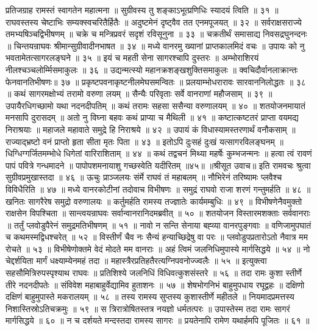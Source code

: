 प्रतिजग्राह रामस्तं स्वागतेन महात्मना ॥
सुग्रीवस्य तु शङ्काऽभूत्प्रणिधिः स्यादयं त्विति ॥ ३१ ॥
राघवस्तस्य चेष्टाभिः सम्यक्स्वचरितैर्हितैः ॥
अदुष्टमेनं दृष्ट्वैव तत एनमपूजयत् ॥ ३२ ॥
सर्वराक्षसराज्ये तमभ्यषिञ्चद्विभीषणम् ॥
चक्रे च मन्त्रिप्रवरं सदृशं रविसूनुना ॥ ३३ ॥
चक्रतीर्थं समासाद्य निवसद्रघुनन्दनः ॥
चिन्तयन्राघवः श्रीमान्सुग्रीवादीनभाषत ॥ ३४ ॥
मध्ये वानरमु ख्यानां प्राप्तकालमिदं वचः ॥
उपायः को नु भवतामेतत्सागरलङ्घने ॥ ३५ ॥
इयं च महती सेना सागरश्चापि दुस्तरः ॥
अम्भोराशिरयं नीलश्चञ्चलोर्म्मिसमाकुलः ॥ ३६ ॥
उद्यन्मत्स्यो महानक्रशङ्खशुक्तिसमाकुलः ॥
क्वचिदौर्वानलाक्रान्तः फेनवानतिभीषणः॥ ३७ ॥
प्रकृष्टपवनाकृष्टनीलमेघसमन्वितः ॥
प्रलयाम्भोधरारावः सारवाननिलोद्धतः ॥ ३८ ॥
कथं सागरमक्षोभ्यं तरामो वरुणा लयम् ॥
सैन्यैः परिवृताः सर्वे वानराणां महौजसाम् ॥ ३९ ॥
उपायैरधिगच्छामो यथा नदनदीपतिम् ॥
कथं तरामः सहसा ससैन्या वरुणालयम् ॥ ४० ॥
शतयोजनमायातं मनसापि दुरासदम् ॥
अतो नु विघ्ना बहवः कथं प्राप्या च मैथिली ॥ ४१ ॥
कष्टात्कष्टतरं प्राप्ता वयमद्य निराश्रयाः ॥
महाजले महावाते समुद्रे हि निराश्रये ॥ ४२ ॥
उपायं कं विधास्यामस्तरणार्थं वनौकसाम् ॥
राज्याद्भ्रष्टो वनं प्राप्तो हृता सीता मृतः पिता ॥ ४३ ॥
इतोऽपि दुःसहं दुःखं यत्सागरविलङ्घनम् ॥
धिग्धिग्गर्जितमम्भोधे धिगेतां वारिराशिताम् ॥ ४४ ॥
कथं तद्वचनं मिथ्या महर्षेः कुम्भजन्मनः ॥
हत्वा त्वं रावणं पापं पवित्रे गन्धमादने ॥
पापोपशमनायाशु गच्छस्वेति यदीरितम् ॥४५॥
॥श्रीसूत उवाच॥
इति रामवचः श्रुत्वा सुग्रीवप्रमुखास्तदा ॥ ४६ ॥
ऊचुः प्राञ्जलयः संर्मे राघवं तं महाबलम् ॥
नौभिरेनं तरिष्यामः प्लवैश्च विविधैरिति ॥ ४७ ॥
मध्ये वानरकोटीनां तदोवाच विभीषणः ॥
समुद्रं राघवो राजा शरणं गन्तुमर्हति ॥ ४८ ॥
खनितः सागरैरेष समुद्रो वरुणालयः ॥
कर्तुमर्हति रामस्य तज्ज्ञातेः कार्यमम्बुधिः ॥ ४९ ॥
विभीषणेनैवमुक्तो राक्षसेन विपश्चिता ॥
सान्त्वयन्राघवः सर्वान्वानरानिदमब्रवीत् ॥ ५० ॥
शतयोजन विस्तारमशक्ताः सर्ववानराः ॥
तर्तुं प्लवोडुपैरेनं समुद्रमतिभीषणम् ॥ ५१ ॥
नावो न सन्ति सेनाया बह्व्या वानरपुङ्गवाः ॥
वणिजामुपघातं च कथमस्मद्विधश्चरेत् ॥ ५२ ॥
विस्तीर्णं चैव नः सैन्यं हन्याच्छिद्रेषु वा परः ॥
प्लवोडुपप्रतारोऽतो नैवात्र मम रोचते ॥ ५३ ॥
विभीषेणोक्तमे वेदं मोदते मम वानराः ॥
अहं त्विमं जलनिधिमुपास्ये मार्गसिद्धये ॥ ५४ ॥
नो चेद्दर्शयिता मार्गं धक्ष्याम्येनमहं तदा ॥
महास्त्रैरप्रतिहतैरत्यग्निपवनोज्ज्वलैः ॥ ५५ ॥
इत्युक्त्वा सहसौमित्रिरुपस्पृश्याथ राघवः ॥
प्रतिशिश्ये जलनिधिं विधिवत्कुशसंस्तरे ॥ ५६ ॥
तदा रामः कुशा स्तीर्णे तीरे नदनदीपतेः ॥
संविवेश महाबाहुर्वेद्यामिव हुताशनः ॥ ५७ ॥
शेषभोगनिभं बाहुमुपधाय रघूद्वहः ॥
दक्षिणो दक्षिणं बाहुमुपास्ते मकरालयम् ॥ ५८ ॥
तस्य रामस्य सुप्तस्य कुशास्तीर्णे महीतले ॥
नियमादप्रमत्तस्य निशास्तिस्रोऽतिचक्रमुः ॥ ५९ ॥
स त्रिरात्रोषितस्तत्र नयज्ञो धर्मतत्परः ॥
उपास्तेस्म तदा रामः सागरं मार्गसिद्धये ॥ ६० ॥
न च दर्शयते मन्दस्तदा रामस्य सागरः ॥
प्रयतेनापि रामेण यथार्हमपि पूजितः ॥ ६१ ॥
